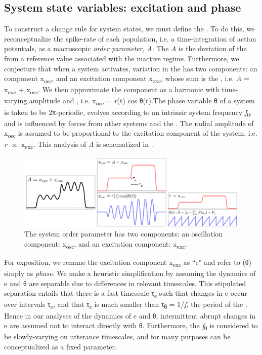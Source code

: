 \subsection{System state variables: excitation and phase}

To construct a change rule for system states, we must define the . To do this, we reconceptualize the spike-rate of each population, i.e. a time-integration of action potentials, as a macroscopic \textit{order parameter}, \textit{A}. The  \textit{A} is the deviation of the  from a reference value associated with the inactive regime. Furthermore, we conjecture that when a system activates, variation in the  has two components: an  component x\textsubscript{osc}, and an excitation component x\textsubscript{exc}, whose sum is the , i.e. \textit{A} = x\textsubscript{exc} + x\textsubscript{osc}. We then approximate the  component as a harmonic  with time-varying amplitude and , i.e. x\textsubscript{osc} = \textit{r}(t) cos θ(t).The phase variable θ of a system is taken to be 2π{}-periodic, evolves according to an intrinsic system frequency \textit{f}\textsubscript{0}, and is influenced by forces from other systems and the . The radial amplitude of x\textsubscript{osc} is assumed to be proportional to the excitation component of the system, i.e. \textit{r}  ${\propto}$ x\textsubscript{exc}. This analysis of \textit{A} is schematized in {}.  

  
\begin{figure}
\includegraphics[width=\textwidth]{figures/Tilsen-img12.png}
\caption{The system order parameter has two components: an oscillation component: x\textsubscript{osc}, and an excitation component: x\textsubscript{exc}.}
\label{fig:2:5}
\end{figure}
 

  For exposition, we rename the excitation component x\textsubscript{exc} as ``e" and refer to  (θ) simply as \textit{phase}. We make a heuristic simplification by assuming the dynamics of e and θ are separable due to differences in relevant timescales. This stipulated separation entails that there is a fast timescale τ\textsubscript{e} such that changes in e occur over intervals τ\textsubscript{e}, and that τ\textsubscript{e} is much smaller than τ\textsubscript{θ} = 1/\textit{f}, the period of the . Hence in our analyses of the dynamics of e and θ, intermittent abrupt changes in e are assumed not to interact directly with θ. Furthermore, the  \textit{f}\textsubscript{0} is considered to be slowly-varying on utterance timescales, and for many purposes can be conceptualized as a fixed parameter. 

